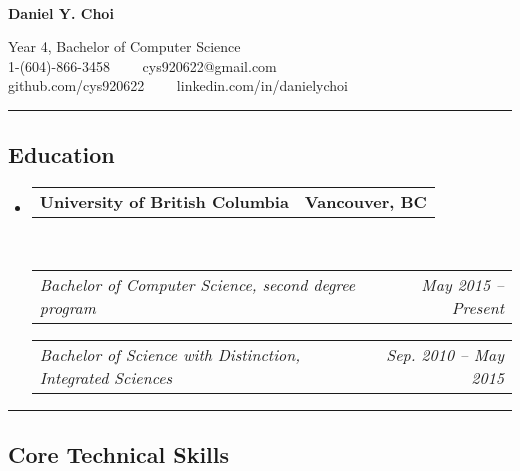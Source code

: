 \documentclass[10pt,letterpaper]{article}
\makeatletter
\newcommand{\headerrow}[2]
{\begin{tabular*}{\linewidth}{l@{\extracolsep{\fill}}r}
	#1 &
	#2 \\
\end{tabular*}}
\makeatother
\begin{document}

\begin{center}
\thispagestyle{firststyle}
{\LARGE \textbf{\\Daniel Y. Choi}}

Year 4, Bachelor of Computer Science
\\
1-(604)-866-3458\ \ \textbullet
\ \ cys920622@gmail.com
\\
github.com/cys920622\ \ \textbullet
\ \ linkedin.com/in/danielychoi
\end{center}

\hrule
\vspace{-0.4em}

\subsection*{Education}

\begin{itemize}
	\parskip=0.1em

	\item 
	\headerrow
		{\textbf{University of British Columbia}}
		{\textbf{Vancouver, BC}}
	\\
	\headerrow
		{\emph{Bachelor of Computer Science, second degree program}}
		{\emph{May 2015 -- Present}}
	
	\headerrow
		{\emph{Bachelor of Science with Distinction, Integrated Sciences}}
		{\emph{Sep. 2010 -- May 2015}}
\end{itemize}


\hrule
\vspace{-0.4em}

\subsection*{Core Technical Skills}
\end{document}

